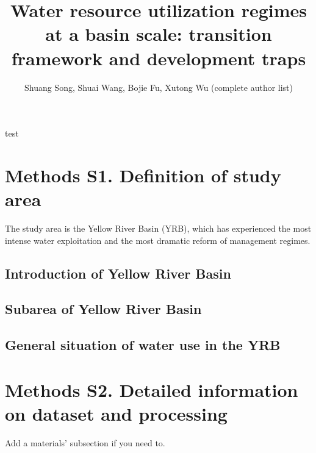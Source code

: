 \documentclass[9pt,twoside,lineno]{pnas-new}
\title{Water resource utilization regimes at a basin scale: transition framework and development traps}
\author{Shuang Song, Shuai Wang, Bojie Fu, Xutong Wu (complete author list)}
\begin{document}

\maketitle

\SItext test



\section*{Methods S1. Definition of study area}
The study area is the Yellow River Basin (YRB), 
which has experienced the most intense water exploitation 
and the most dramatic reform of management regimes.

\subsection*{Introduction of Yellow River Basin}
\subsection*{Subarea of Yellow River Basin}
\subsection*{General situation of water use in the YRB}

\section*{Methods S2. Detailed information on dataset and processing}
Add a materials' subsection if you need to.
\end{document}
